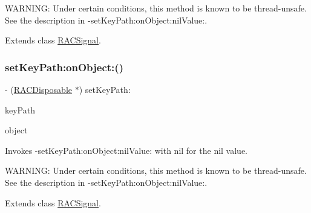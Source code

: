W\+A\+R\+N\+I\+NG\+: Under certain conditions, this method is known to be thread-\/unsafe. See the description in -\/set\+Key\+Path\+:on\+Object\+:nil\+Value\+:. 

Extends class \mbox{\hyperlink{interface_r_a_c_signal_ada2a2f51a30fb8bef13819c50ebfbf85}{R\+A\+C\+Signal}}.

\mbox{\label{category_r_a_c_signal_07_operations_08_ada2a2f51a30fb8bef13819c50ebfbf85}} 
\subsubsection{\texorpdfstring{set\+Key\+Path\+:on\+Object\+:()}{setKeyPath:onObject:()}\hspace{0.1cm}{\footnotesize\ttfamily [3/3]}}
{\footnotesize\ttfamily -\/ (\mbox{\hyperlink{interface_r_a_c_disposable}{R\+A\+C\+Disposable}} $\ast$) set\+Key\+Path\+: \begin{DoxyParamCaption}\item[{(N\+S\+String $\ast$)}]{key\+Path }\item[{onObject:(N\+S\+Object $\ast$)}]{object }\end{DoxyParamCaption}}

Invokes -\/set\+Key\+Path\+:on\+Object\+:nil\+Value\+: with {\ttfamily nil} for the nil value.

W\+A\+R\+N\+I\+NG\+: Under certain conditions, this method is known to be thread-\/unsafe. See the description in -\/set\+Key\+Path\+:on\+Object\+:nil\+Value\+:. 

Extends class \mbox{\hyperlink{interface_r_a_c_signal_ada2a2f51a30fb8bef13819c50ebfbf85}{R\+A\+C\+Signal}}.

\mbox{\label{category_r_a_c_signal_07_operations_08_a3d59cca19be3e985aa5a08cb0386faeb}} 
